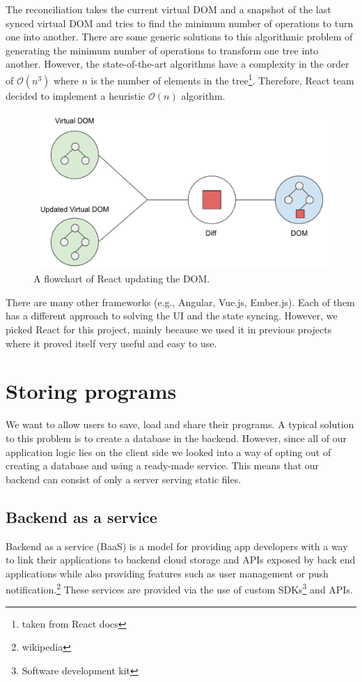 The reconciliation takes the current virtual DOM and a snapshot of the last synced virtual DOM and tries to find the minimum number of operations to turn
one into another. There are some generic solutions to this algorithmic problem of generating the minimum number of operations to transform one tree into another.
However, the state-of-the-art algorithms \cite{TreeEditDistance} have a complexity in the order of $\mathcal{O}(n^3)$ where $n$ is the number of elements in
the tree\footnote{taken from React docs}. Therefore, React team decided to implement a heuristic $\mathcal{O}(n)$ algorithm.

\begin{figure}[!hbt]
    \centering
	\includegraphics[width=\textwidth]{../img/virtual_dom}
	\caption{A flowchart of React updating the DOM.}
	\label{fig:chap2:virtual_dom}
\end{figure}

There are many other frameworks (e.g., Angular, Vue.js, Ember.js). Each of them has a different approach to solving the UI and the state syncing. However, we picked
React for this project, mainly because we used it in previous projects where it proved itself very useful and easy to use.

\section{Storing programs}
We want to allow users to save, load and share their programs. A typical solution to this problem is to create a database in the backend. However, since all
of our application logic lies on the client side we looked into a way of opting out of creating a database and using a ready-made service. This means that
our backend can consist of only a server serving static files.

\subsection{Backend as a service}
Backend as a service (BaaS) is a model for providing app developers with a way to link their applications to backend cloud storage and APIs exposed by back end
applications while also providing features such as user management or push notification.\footnote{wikipedia} These services are provided via the use of custom
SDKs\footnote{Software development kit} and APIs.

